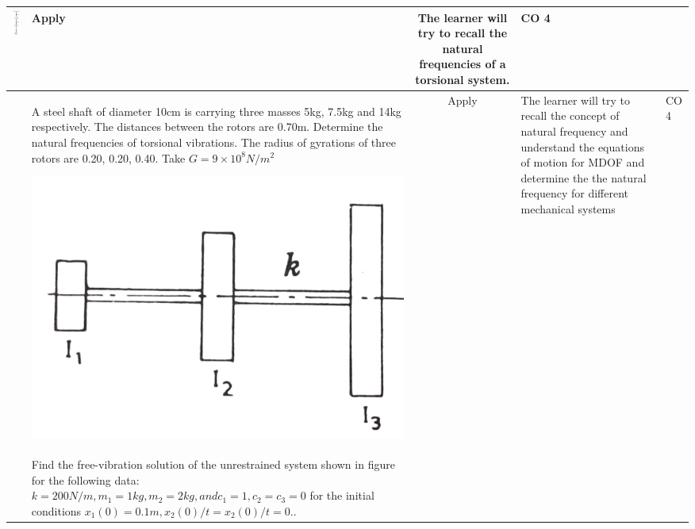 \documentclass[11pt,paper=a4,answers]{exam}
\begin{document}
\begin{flushleft}
\begin{longtable}{|>{\centering\arraybackslash}p{0.8cm}  | >{\raggedright\arraybackslash}p{6.5cm}  | c | >{\raggedright\arraybackslash}p{5cm} |>{\centering\arraybackslash}p{1cm}|}
\includegraphics[scale=0.2]{6_17.png}
&	Apply&	The learner will try to \textbf{recall} the natural frequencies of a torsional system. &	CO 4\\
	\hline 
9& A steel shaft of diameter 10cm is carrying three masses 5kg, 7.5kg and 14kg respectively. The distances between the rotors are 0.70m. Determine the natural frequencies of torsional vibrations. The radius of gyrations of three rotors are 0.20, 0.20, 0.40. Take $G=9\times 10^{8}N/m^{2}$

\includegraphics[scale=0.2]{6_12.png}&	Apply&	The learner will try to recall the concept of natural frequency and understand the equations of motion for MDOF and determine the the natural frequency for different mechanical systems 

&	CO 4\\
	\hline 
10 & Find the free-vibration solution of the unrestrained system shown in figure for the following
data: $k= 200 N/m, m_1= 1 kg, m_2= 2 kg, and c_1=1, c_2=c_3=0 $ for the initial conditions $ x_1(0)= 0.1 m, x_2(0)/t=x_2(0)/t=0. $. 


\end{longtable}
\end{flushleft}
\end{document}
